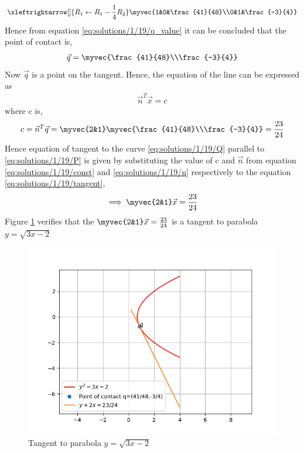 \begin{align}
\xleftrightarrow[]{R_1\leftarrow R_1-\frac{1}{4}R_2} \myvec{1&0&\frac{41}{48}\\0&1&\frac{-3}{4}}
\label{eq:solutions/1/19/q_value}
\end{align}
Hence from equation \eqref{eq:solutions/1/19/q_value} it can be concluded that the point of contact is,
\begin{align}
\vec{q} = \myvec{\frac{41}{48}\\\frac{-3}{4}}
\end{align}
Now $\vec{q}$ is a point on the tangent. Hence, the equation of the
line can be expressed as
\begin{align}
\vec{n}^T\vec{x} = c
\label{eq:solutions/1/19/tangent}
\end{align}
where c is,
\begin{align}
 c = \vec{n}^T\vec{q} = \myvec{2&1}\myvec{\frac{41}{48}\\\frac{-3}{4}} = \frac{23}{24} 
 \label{eq:solutions/1/19/const}
\end{align}
Hence equation of tangent to the curve \eqref{eq:solutions/1/19/Q} parallel to \eqref{eq:solutions/1/19/P} is given by substituting the value of c and $\vec{n}$ from equation \eqref{eq:solutions/1/19/const} and \eqref{eq:solutions/1/19/n} respectively to the equation \eqref{eq:solutions/1/19/tangent},
\begin{align}
\implies\myvec{2&1}\vec{x} = \frac{23}{24} 
\end{align}
Figure \ref{eq:solutions/1/19/Figure_1} verifies that the $\myvec{2&1}\vec{x} = \frac{23}{24}$ is a tangent to parabola  $y=\sqrt{3x-2}$
\begin{figure}[ht!]
\centering
\includegraphics[width=\columnwidth]{./solutions/conics/1/19/Figure_1.png}
\caption{Tangent to parabola $y=\sqrt{3x-2}$}
\label{eq:solutions/1/19/Figure_1}
\end{figure}
